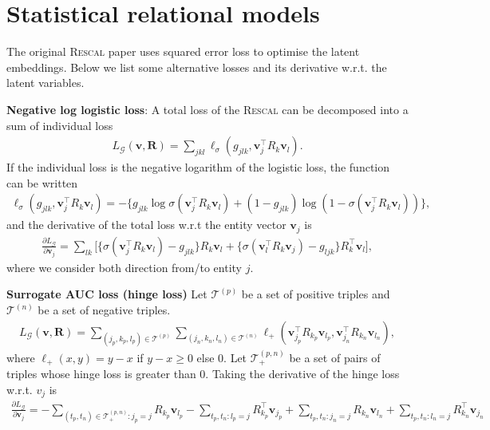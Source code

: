 \documentclass{article} %
\theoremstyle{definition}
\newcommand\bs{\boldsymbol}
\begin{document}
\section*{Statistical relational models}
The original \textsc{Rescal} paper uses squared error loss to optimise the latent embeddings. Below we list some alternative losses and its derivative w.r.t. the latent variables.

\textbf{Negative log logistic loss}:
A total loss of the \textsc{Rescal} can be decomposed into a sum of individual loss
\begin{align}
L_\mathcal{G}(\mathbf{v}, \mathbf{R}) = \sum_{jkl} \ell_\sigma(g_{jlk}, \bs{v}_j^\top R_k \bs{v}_l).
\end{align}
If the individual loss is the negative logarithm of the logistic loss, the function can be written
\begin{align}
\ell_\sigma(g_{jlk}, \bs{v}_j^\top R_k \bs{v}_l) = - \bigg\{g_{jlk} \log \sigma(\bs{v}_j^\top R_k \bs{v}_l) + (1- g_{jlk}) \log (1- \sigma(\bs{v}_j^\top R_k \bs{v}_l))\bigg\},
\end{align}
and the derivative of the total loss w.r.t the entity vector $\bs{v}_j$ is
\begin{align}
\frac{\partial L_\mathcal{G}}{\partial \bs{v}_j} =  \sum_{lk}\bigg[\Big\{\sigma(\bs{v}_j^\top R_k \bs{v}_l) - g_{jlk}\Big\} R_k \bs{v}_l + \Big\{\sigma(\bs{v}_l^\top R_k \bs{v}_j) - g_{ljk}\Big\} R_k^\top \bs{v}_l \bigg],
\end{align}
where we consider both direction from/to entity $j$.

\textbf{Surrogate AUC loss (hinge loss)}
Let $\mathcal{T}^{(p)}$ be a set of positive triples and $\mathcal{T}^{(n)}$ be a set of negative triples.
\begin{align}
L_\mathcal{G}(\mathbf{v}, \mathbf{R}) = \sum_{(j_p,k_p,l_p) \in \mathcal{T}^{(p)}}\sum_{(j_n, k_n, l_n) \in \mathcal{T}^{(n)}} \ell_+(\bs{v}_{j_p}^\top R_{k_p} \bs{v}_{l_p}, \bs{v}_{j_n}^\top R_{k_n} \bs{v}_{l_n}),
\end{align}
where $\ell_+(x, y) = y - x$ if $y - x \geq 0$ else 0. Let $\mathcal{T}_+^{(p,n)}$ be a set of pairs of triples whose hinge loss is greater than 0. Taking the derivative of the hinge loss w.r.t. $v_j$ is
\begin{align}
\frac{\partial L_\mathcal{G}}{\partial \bs{v}_j} = - \sum_{(t_p, t_n) \in \mathcal{T}_+^{(p,n)} : j_p = j} R_{k_p}\bs{v}_{l_p} - \sum_{t_p, t_n: l_p = j} R_{k_p}^\top \bs{v}_{j_p} + \sum_{t_p, t_n: j_n = j} R_{k_n}\bs{v}_{l_n}  + \sum_{t_p, t_n: l_n = j} R_{k_n}^\top \bs{v}_{j_n}
\end{align}
\end{document}
